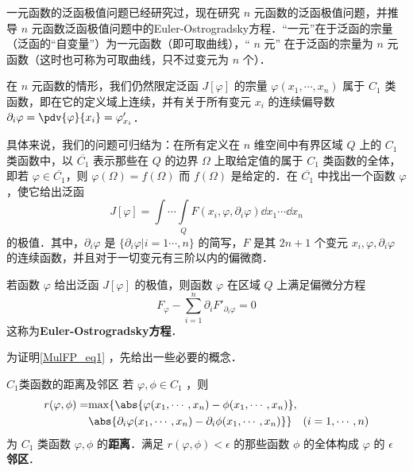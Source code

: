 
一元函数的泛函极值问题已经研究过，现在研究 $n$ 元函数的泛函极值问题，并推导 $n$ 元函数泛函极值问题中的Euler-Ostrogradsky方程．“一元”在于泛函的宗量（泛函的“自变量”）为一元函数（即可取曲线），“ $n$ 元” 在于泛函的宗量为 $n$ 元函数（这时也可称为可取曲线，只不过变元为 $n$ 个）．

在 $n$ 元函数的情形，我们仍然限定泛函 $J[\varphi]$ 的宗量 $\varphi(x_1,\cdots,x_n)$ 属于 $C_1$ 类函数，即在它的定义域上连续，并有关于所有变元 $x_i$ 的连续偏导数 $\partial_i\varphi=\pdv{\varphi}{x_i}=\varphi'_{x_i}$．

具体来说，我们的问题可归结为：在所有定义在 $n$ 维空间中有界区域 $Q$ 上的 $C_1$ 类函数中，以 $\overline{C_1}$ 表示那些在 $Q$ 的边界 $\Omega$ 上取给定值的属于 $C_1$ 类函数的全体，即若 $\varphi\in\overline{C_1}$，则 $\varphi(\Omega)=f(\Omega)$ 而 $f(\Omega)$ 是给定的．在 $\overline{C_1}$ 中找出一个函数 $\varphi$，使它给出泛函
\begin{equation}
J[\varphi]=\int\cdots\int\limits_Q F(x_i,\varphi,\partial_i\varphi)\dd x_1\cdots\dd x_n
\end{equation}
的极值．其中，$\partial_i\varphi$ 是 $\{\partial_i\varphi|i=1\cdots,n\}$ 的简写，$F$ 是其 $2n+1$ 个变元 $x_i,\varphi,\partial_i\varphi$ 的连续函数，并且对于一切变元有三阶以内的偏微商．

若函数 $\varphi$ 给出泛函 $J[\varphi]$ 的极值，则函数 $\varphi$ 在区域 $Q$ 上满足偏微分方程
\begin{equation}\label{MulFP_eq1}
F_\varphi-\sum_{i=1}^n\partial_i F'_{\partial_i\varphi}=0
\end{equation}
这称为\textbf{Euler-Ostrogradsky方程}．

为证明\autoref{MulFP_eq1} ，先给出一些必要的概念．
\begin{definition}{$C_1$类函数的距离及邻区}
若 $\varphi,\phi\in C_1$ ，则
\begin{equation}
\begin{aligned}
r(\varphi,\phi)=&\mathrm{max}\{\abs{\varphi(x_1,\cdots,x_n)-\phi(x_1,\cdots,x_n)},\\
&\abs{\partial_i\varphi(x_1,\cdots,x_n)-\partial_i\phi(x_1,\cdots,x_n)}\}\quad (i=1,\cdots,n)
\end{aligned}
\end{equation}
为 $C_1$ 类函数 $\varphi,\phi$ 的\textbf{距离}．满足 $r(\varphi,\phi)<\epsilon$ 的那些函数 $\phi$ 的全体构成 $\varphi$ 的 $\epsilon$ \textbf{邻区}． 
\end{definition}

